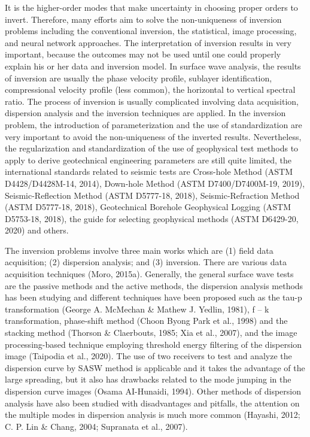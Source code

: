It is the higher-order modes that make uncertainty in choosing proper orders to invert. Therefore, many efforts aim to solve the non-uniqueness of inversion problems including the conventional inversion, the statistical, image processing, and neural network approaches. The interpretation of inversion results in very important, because the outcomes may not be used until one could properly explain his or her data and inversion model. In surface wave analysis, the results of inversion are usually the phase velocity profile, sublayer identification, compressional velocity profile (less common), the horizontal to vertical spectral ratio. The process of inversion is usually complicated involving data acquisition, dispersion analysis and the inversion techniques are applied. In the inversion problem, the introduction of parameterization and the use of standardization are very important to avoid the non-uniqueness of the inverted results. Nevertheless, the regularization and standardization of the use of geophysical test methods to apply to derive geotechnical engineering parameters are still quite limited, the international standards related to seismic tests are Cross-hole Method (ASTM D4428/D4428M-14, 2014), Down-hole Method (ASTM D7400/D7400M-19, 2019), Seismic-Reflection Method (ASTM D5777-18, 2018), Seismic-Refraction Method (ASTM D5777-18, 2018), Geotechnical Borehole Geophysical Logging (ASTM D5753-18, 2018), the guide for selecting geophysical methods (ASTM D6429-20, 2020) and others. 
 
The inversion problems involve three main works which are (1) field data acquisition; (2) dispersion analysis; and (3) inversion. There are various data acquisition techniques (Moro, 2015a). Generally, the general surface wave tests are the passive methods and the active methods, the dispersion analysis methods has been studying and different techniques have been proposed such as the tau-p transformation (George A. McMechan \& Mathew J. Yedlin, 1981), f – k transformation, phase-shift method (Choon Byong Park et al., 1998) and the stacking method (Thorson \& Claerbouts, 1985; Xia et al., 2007), and the image processing-based technique employing threshold energy filtering of the dispersion image (Taipodia et al., 2020). The use of two receivers to test and analyze the dispersion curve by SASW method is applicable and it takes the advantage of the large spreading, but it also has drawbacks related to the mode jumping in the dispersion curve images (Osama AI-Hunaidi, 1994). Other methods of dispersion analysis have also been studied with disadvantages and pitfalls, the attention on the multiple modes in dispersion analysis is much more common (Hayashi, 2012; C. P. Lin \& Chang, 2004; Supranata et al., 2007).    
 
